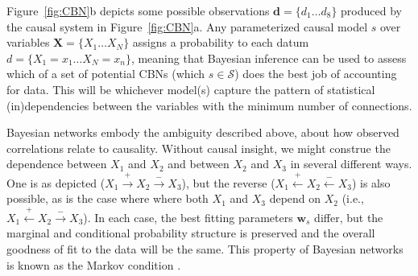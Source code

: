 \documentclass{cambridge7A}%
\newcommand{\ww}{\mathbf{w}} %
\newcommand{\dm}{d} %
\newcommand{\da}{\mathbf{d}} %
\begin{document}
Figure~\ref{fig:CBN}b depicts some possible observations $\da=\{\dm_1\ldots \dm_8\}$ produced by the causal system in Figure~\ref{fig:CBN}a. %
Any parameterized causal model $s$ over variables $\mathbf{X} =\{X_1 \ldots X_N\}$ assigns a probability to each datum ${\dm}=\{X_1=x_1\ldots X_N=x_n\}$, meaning that Bayesian inference can be used to assess which of a set of potential CBNs (which $s\in\mathcal{S}$) does the best job of accounting for data.  This will be whichever model(s) capture the pattern of statistical (in)dependencies between the variables with the minimum number of connections.  %

Bayesian networks embody the ambiguity described above, about how observed correlations relate to causality.  Without causal insight, we might construe the dependence between $X_1$ and $X_2$ and between $X_2$ and $X_3$ in several different ways.  One is as depicted ($X_1\!\stackrel{+}\rightarrow\!X_2\!\stackrel{-}\rightarrow\!X_3$), but the reverse ($X_1\!\stackrel{+}\leftarrow\!X_2\!\stackrel{-}\leftarrow\!X_3$) is also possible, as is the case where where both $X_1$ and $X_3$ depend on $X_2$ (i.e., $X_1\!\stackrel{+}\leftarrow\!X_2\!\stackrel{-}\rightarrow\!X_3$).  In each case, the best fitting parameters $\ww_s$ differ, but the marginal and conditional probability structure is 
preserved and the overall goodness of fit to the data will be the same.  This property of Bayesian networks is known as the Markov condition \citep{pearl2000causality}.
\end{document}
